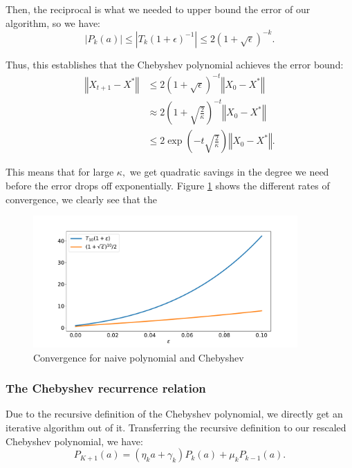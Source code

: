 Then, the reciprocal is what we needed to upper bound the error of our algorithm, so we have:
\begin{equation*}
|P_k(a)| \leq {|T_k(1 + \epsilon)^{-1}|} \leq 2(1 + \sqrt{\epsilon})^{-k}.
\end{equation*}

Thus, this establishes that the Chebyshev polynomial achieves the error bound:
\begin{align*}
\left\Vert X_{t+1} - X^* \right\Vert &\leq 2(1 + \sqrt{\epsilon})^{-t} \left\Vert X_0 -X^*\right\Vert \\
&\approx 2(1 + \sqrt{\frac{2}{\kappa}})^{-t} \left\Vert X_0 -X^*\right\Vert \\
&\leq 2\exp\left(-t \sqrt{\frac{2}{\kappa}}\right) \left\Vert X_0 -X^*\right\Vert.
\end{align*}

This means that for large $\kappa,$ we get quadratic savings in the degree we need before the error drops off exponentially. Figure \ref{convergence} shows the different rates of convergence, we clearly see that the 

\begin{figure}[ht]
\includegraphics[width=0.9\textwidth]{figures/lecture6-conv.pdf}
\centering
\caption{Convergence for naive polynomial and Chebyshev}
\label{convergence}
\end{figure}

\subsubsection{The Chebyshev recurrence relation}
Due to the recursive definition of the Chebyshev polynomial, we directly get an iterative algorithm out of it. Transferring the recursive definition to our rescaled Chebyshev polynomial, we have:
\begin{equation*}
P_{K+1}(a) = (\eta_k a + \gamma_k)P_k(a) + \mu_k P_{k-1}(a).
\end{equation*}

